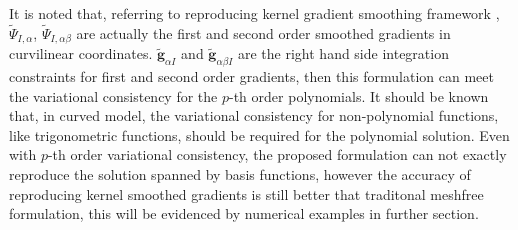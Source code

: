 It is noted that, referring to reproducing kernel gradient smoothing framework \cite{wang2019d}, $\tilde \Psi_{I,\alpha}$, $\tilde \Psi_{I,\alpha\beta}$ are actually the first and second order smoothed gradients in curvilinear coordinates. $\tilde{\boldsymbol g}_{\alpha I}$ and $\tilde{\boldsymbol g}_{\alpha \beta I}$ are the right hand side integration constraints for first and second order gradients, then this formulation can meet the variational consistency for the $p$-th order polynomials. It should be known that, in curved model, the variational consistency for non-polynomial functions, like trigonometric functions, should be required for the polynomial solution. Even with $p$-th order variational consistency, the proposed formulation can not exactly reproduce the solution spanned by basis functions, however the accuracy of reproducing kernel smoothed gradients is still better that traditonal meshfree formulation, this will be evidenced by numerical examples in further section.

